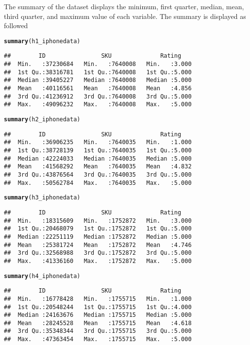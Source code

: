 \documentclass{article}\usepackage[]{graphicx}\usepackage[]{color}
\makeatletter
\newcommand{\hlstd}[1]{\textcolor[rgb]{0.345,0.345,0.345}{#1}}%
\newcommand{\hlkwd}[1]{\textcolor[rgb]{0.737,0.353,0.396}{\textbf{#1}}}%
\newenvironment{kframe}{%
 \def\at@end@of@kframe{}%
 \ifinner\ifhmode%
  \def\at@end@of@kframe{\end{minipage}}%
  \begin{minipage}{\columnwidth}%
 \fi\fi%
 \def\FrameCommand##1{\hskip\@totalleftmargin \hskip-\fboxsep
 \colorbox{shadecolor}{##1}\hskip-\fboxsep
     \hskip-\linewidth \hskip-\@totalleftmargin \hskip\columnwidth}%
 \MakeFramed {\advance\hsize-\width
   \@totalleftmargin\z@ \linewidth\hsize
   \@setminipage}}%
 {\par\unskip\endMakeFramed%
 \at@end@of@kframe}
\newenvironment{knitrout}{}{} %
\makeatother
\begin{document}
The summary of the dataset displays the minimum, first quarter, median,
mean, third quarter, and maximum value of each variable. The summary is
displayed as followed
\begin{knitrout}
\color{fgcolor}\begin{kframe}
\begin{alltt}
\hlkwd{summary}\hlstd{(h1_iphonedata)}
\end{alltt}
\begin{verbatim}
##        ID                SKU              Rating     
##  Min.   :37230684   Min.   :7640008   Min.   :3.000  
##  1st Qu.:38316781   1st Qu.:7640008   1st Qu.:5.000  
##  Median :39405227   Median :7640008   Median :5.000  
##  Mean   :40116561   Mean   :7640008   Mean   :4.856  
##  3rd Qu.:41236912   3rd Qu.:7640008   3rd Qu.:5.000  
##  Max.   :49096232   Max.   :7640008   Max.   :5.000
\end{verbatim}
\begin{alltt}
\hlkwd{summary}\hlstd{(h2_iphonedata)}
\end{alltt}
\begin{verbatim}
##        ID                SKU              Rating     
##  Min.   :36906235   Min.   :7640035   Min.   :1.000  
##  1st Qu.:38728139   1st Qu.:7640035   1st Qu.:5.000  
##  Median :42224033   Median :7640035   Median :5.000  
##  Mean   :41568292   Mean   :7640035   Mean   :4.832  
##  3rd Qu.:43876564   3rd Qu.:7640035   3rd Qu.:5.000  
##  Max.   :50562784   Max.   :7640035   Max.   :5.000
\end{verbatim}
\begin{alltt}
\hlkwd{summary}\hlstd{(h3_iphonedata)}
\end{alltt}
\begin{verbatim}
##        ID                SKU              Rating     
##  Min.   :18315609   Min.   :1752872   Min.   :3.000  
##  1st Qu.:20468079   1st Qu.:1752872   1st Qu.:5.000  
##  Median :22251119   Median :1752872   Median :5.000  
##  Mean   :25381724   Mean   :1752872   Mean   :4.746  
##  3rd Qu.:32568988   3rd Qu.:1752872   3rd Qu.:5.000  
##  Max.   :41336160   Max.   :1752872   Max.   :5.000
\end{verbatim}
\begin{alltt}
\hlkwd{summary}\hlstd{(h4_iphonedata)}
\end{alltt}
\begin{verbatim}
##        ID                SKU              Rating     
##  Min.   :16778428   Min.   :1755715   Min.   :1.000  
##  1st Qu.:20548244   1st Qu.:1755715   1st Qu.:4.000  
##  Median :24163676   Median :1755715   Median :5.000  
##  Mean   :28245528   Mean   :1755715   Mean   :4.618  
##  3rd Qu.:35348344   3rd Qu.:1755715   3rd Qu.:5.000  
##  Max.   :47363454   Max.   :1755715   Max.   :5.000
\end{verbatim}
\end{kframe}
\end{knitrout}
\end{document}

